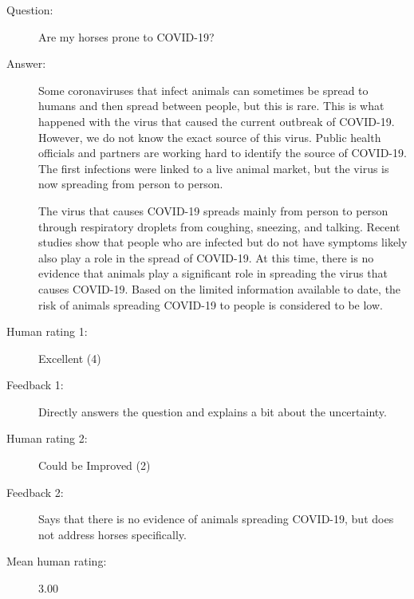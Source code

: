 \begin{description}
    \item[Question:] Are my horses prone to COVID-19?

    \item[Answer:] Some coronaviruses that infect animals can sometimes be spread to humans and
    then spread between people, but this is rare. This is what happened with the
    virus that caused the current outbreak of COVID-19. However, we do not know
    the exact source of this virus. Public health officials and partners are
    working hard to identify the source of COVID-19. The first infections were
    linked to a live animal market, but the virus is now spreading from person to person.

    The virus that causes COVID-19 spreads mainly from person to person through
    respiratory droplets from coughing, sneezing, and talking. Recent studies show
    that people who are infected but do not have symptoms likely also play a role
    in the spread of COVID-19. At this time, there is no evidence that animals
    play a significant role in spreading the virus that causes COVID-19. Based on
    the limited information available to date, the risk of animals spreading
    COVID-19 to people is considered to be low.

    \item[Human rating 1:] Excellent (4)

    \item[Feedback 1:] Directly answers the question and explains a bit about the uncertainty.

    \item[Human rating 2:] Could be Improved (2)

    \item[Feedback 2:] Says that there is no evidence of animals spreading COVID-19, but does not address horses specifically.

    \item[Mean human rating:] 3.00
\end{description}

